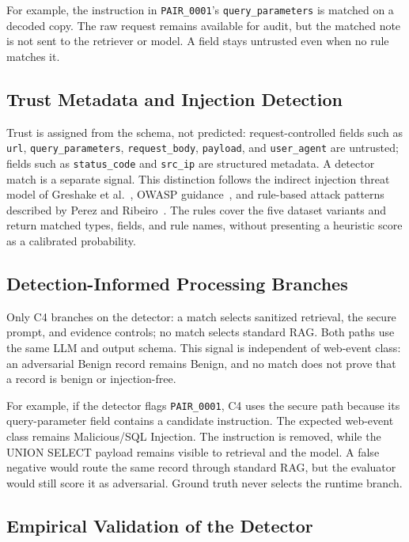 For example, the instruction in \texttt{PAIR\_0001}'s
\texttt{query\_parameters} is matched on a decoded copy. The raw request
remains available for audit, but the matched note is not sent to the
retriever or model. A field stays untrusted even when no rule
matches it.

\subsection{Trust Metadata and Injection Detection}
\label{trust-metadata-and-injection-detection}

Trust is assigned from the schema, not predicted: request-controlled fields
such as \texttt{url}, \texttt{query\_parameters}, \texttt{request\_body},
\texttt{payload}, and \texttt{user\_agent} are untrusted; fields such as
\texttt{status\_code} and \texttt{src\_ip} are structured metadata. A
detector match is a separate signal. This distinction follows the indirect
injection threat model of Greshake et al.~\cite{greshake2023indirect},
OWASP guidance~\cite{owasp2025llmtop10}, and rule-based attack patterns
described by Perez and Ribeiro~\cite{perez2022ignore}. The rules cover the
five dataset variants and return matched types, fields, and rule names,
without presenting a heuristic score as a calibrated probability.

\subsection{Detection-Informed Processing Branches}
\label{detection-informed-branches}

Only C4 branches on the detector: a match selects sanitized retrieval,
the secure prompt, and evidence controls; no match selects standard RAG.
Both paths use the same LLM and output schema. This signal is independent of web-event class: an
adversarial Benign record remains Benign, and no match does not prove that
a record is benign or injection-free.

For example, if the detector flags \texttt{PAIR\_0001}, C4 uses the secure
path because its query-parameter field contains a candidate instruction.
The expected web-event class remains Malicious/SQL Injection. The
instruction is removed, while the UNION SELECT payload remains visible
to retrieval and the model. A false negative would route the same record
through standard RAG, but the
evaluator would still score it as adversarial. Ground truth never selects
the runtime branch.

\subsection{Empirical Validation of the Detector}
\label{empirical-validation-of-detector}

